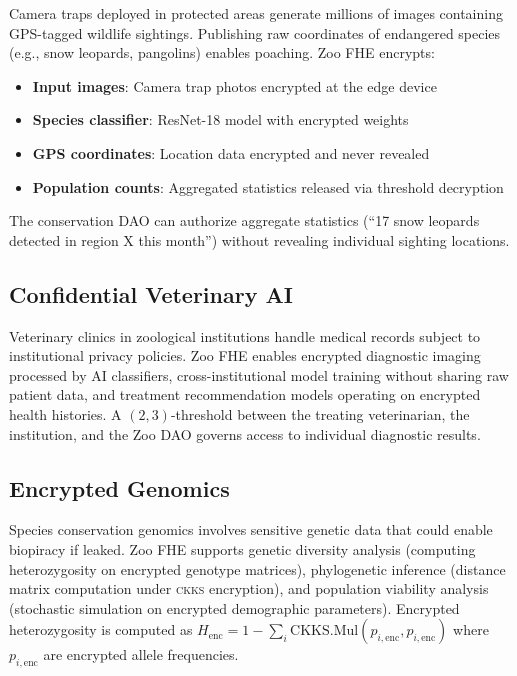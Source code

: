 \documentclass[11pt,letterpaper]{article}
\newcommand{\CKKS}{\textsc{ckks}}
\begin{document}
Camera traps deployed in protected areas generate millions of images containing GPS-tagged wildlife sightings. Publishing raw coordinates of endangered species (e.g., snow leopards, pangolins) enables poaching. Zoo FHE encrypts:

\begin{itemize}
    \item \textbf{Input images}: Camera trap photos encrypted at the edge device
    \item \textbf{Species classifier}: ResNet-18 model with encrypted weights
    \item \textbf{GPS coordinates}: Location data encrypted and never revealed
    \item \textbf{Population counts}: Aggregated statistics released via threshold decryption
\end{itemize}

The conservation DAO can authorize aggregate statistics (``17 snow leopards detected in region X this month'') without revealing individual sighting locations.

\subsection{Confidential Veterinary AI}

Veterinary clinics in zoological institutions handle medical records subject to institutional privacy policies. Zoo FHE enables encrypted diagnostic imaging processed by AI classifiers, cross-institutional model training without sharing raw patient data, and treatment recommendation models operating on encrypted health histories. A $(2, 3)$-threshold between the treating veterinarian, the institution, and the Zoo DAO governs access to individual diagnostic results.

\subsection{Encrypted Genomics}

Species conservation genomics involves sensitive genetic data that could enable biopiracy if leaked. Zoo FHE supports genetic diversity analysis (computing heterozygosity on encrypted genotype matrices), phylogenetic inference (distance matrix computation under \CKKS{} encryption), and population viability analysis (stochastic simulation on encrypted demographic parameters). Encrypted heterozygosity is computed as $H_{\text{enc}} = 1 - \sum_{i} \text{CKKS.Mul}(p_{i,\text{enc}}, p_{i,\text{enc}})$ where $p_{i,\text{enc}}$ are encrypted allele frequencies.
\end{document}
